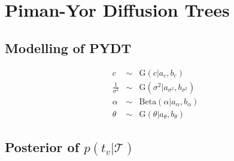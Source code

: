 \documentclass{article}
\begin{document}
\section{Piman-Yor Diffusion Trees}
\subsection{Modelling of PYDT}	

	\begin{eqnarray}
		c &\sim& \textrm{G}(c | a_c, b_c) \\
		\frac{1}{\sigma^2} &\sim& \textrm{G}(\sigma^2 | a_{\sigma^2}, b_{\sigma^2}) \\
		\alpha &\sim& \textrm{Beta}(\alpha | a_\alpha, b_\alpha) \\ 
		\theta &\sim& \textrm{G}(\theta | a_\theta, b_\theta)
	\end{eqnarray}


\subsection{Posterior of $p(t_v | \mathcal{T})$}	
	
\end{document}
